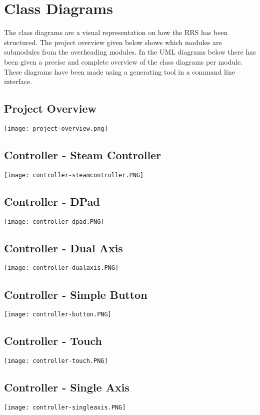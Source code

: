 \section{Class Diagrams}
The class diagrams are a visual representation on how the RRS has been structured. The project overview given below shows which modules are submodules from the overheading modules. In the UML diagrams below there has been given a precise and complete overview of the class diagrams per module. These diagrams have been made using a generating tool in a command line interface.

\subsection{Project Overview}
\texttt{[image: project-overview.png]}

\subsection{Controller - Steam Controller}
\texttt{[image: controller-steamcontroller.PNG]}

\subsection{Controller - DPad}
\texttt{[image: controller-dpad.PNG]}

\subsection{Controller - Dual Axis}
\texttt{[image: controller-dualaxis.PNG]}

\subsection{Controller - Simple Button}
\texttt{[image: controller-button.PNG]}

\subsection{Controller - Touch}
\texttt{[image: controller-touch.PNG]}

\subsection{Controller - Single Axis}
\texttt{[image: controller-singleaxis.PNG]}


